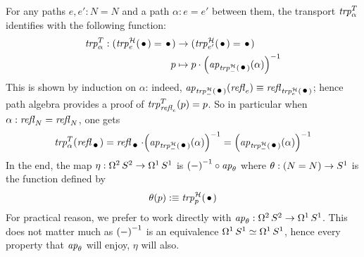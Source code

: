 \documentclass[english,a4]{article}
\begin{document}
For any paths $e,e':N=N$ and a path $\alpha: e=e'$ between them, the
transport
$\trp[T]{\alpha}$
identifies with the following function:
\begin{equation}
  \begin{aligned}
    {\trp[T]{\alpha}}: (\trp[\hopffam]{e}(\base) = \base) &\to (\trp[\hopffam]{e'}(\base) = \base)
    \\
    p &\mapsto p\cdot \inv{\left(\ap{\trp[\hopffam]{\blank}(\base)}(\alpha)\right)}
  \end{aligned}
\end{equation}
This is shown by induction on $\alpha$: indeed,
$\ap{\trp[\hopffam]{\blank}(\base)}(\refl{e}) \jdeq \refl{\trp[\hopffam]{e}(\base)}$; hence
path algebra provides a proof of $\trp[T]{\refl{e}}(p) = p$. So in
particular when $\alpha:\refl N = \refl N$, one gets
\begin{equation}\label{eq:trp-Ta(refl)}
  \trp[T]{\alpha}(\refl \base) = \refl \base \cdot \inv{\left(\ap{\trp[\hopffam]{\blank}(\base)}(\alpha)\right)}
  = \inv{\left(\ap{\trp[\hopffam]{\blank}(\base)}(\alpha)\right)}
\end{equation}
In the end, the map $\eta\from \loopspace 2 \Sp \to \loopspace 1 \Sc$
is $\inv{(\blank)} \circ \ap \theta$ where $\theta : (N=N) \to \Sc$ is the function defined by
\begin{equation}
  \label{eq:17}
  \theta(p) \defequi \trp[\hopffam]{p}(\base)
\end{equation}
For practical reason, we prefer to work directly with
$\ap\theta\from \loopspace 2 \Sp \to \loopspace 1 \Sc$. This does not
matter much as $\inv{(\blank)}$ is an equivalence
$\loopspace 1 \Sc \weq \loopspace 1 \Sc$, hence every property that
$\ap\theta$ will enjoy, $\eta$ will also.
\end{document}
